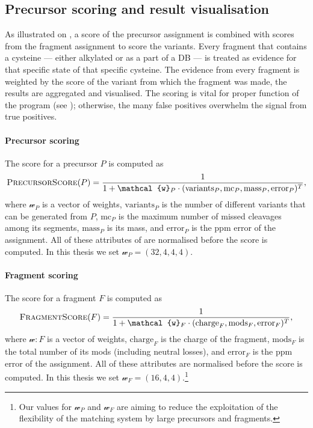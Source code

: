 \subsection{Precursor scoring and result visualisation}\label{sec:scoring}

As illustrated on , a score of the precursor assignment is combined with scores from the fragment assignment to score the variants. Every fragment that contains a cysteine --- either alkylated or as a part of a DB --- is treated as evidence for that specific state of that specific cysteine. The evidence from every fragment is weighted by the score of the variant from which the fragment was made, the results are aggregated and visualised. The scoring is vital for proper function of the program (see ); otherwise, the many false positives overwhelm the signal from true positives.

\paragraph{Precursor scoring} The score for a precursor \(P\) is computed as \[\textsc{PrecursorScore}(P) = \frac{1}{1 + \mathcal{w}_P \cdot (\mathrm{variants}_P, \mathrm{mc}_P, \mathrm{mass}_P, \mathrm{error}_P)^T},\] where \(\mathcal{w}_P\) is a vector of weights, \(\mathrm{variants}_P\) is the number of different variants that can be generated from \(P\), \(\mathrm{mc}_P\) is the maximum number of missed cleavages among its segments, \(\mathrm{mass}_P\) is its mass, and \(\mathrm{error}_P\) is the ppm error of the assignment. All of these attributes of are normalised before the score is computed. In this thesis we set \(\mathcal{w}_P = (32, 4, 4, 4)\).

\paragraph{Fragment scoring} The score for a fragment \(F\) is computed as \[\textsc{FragmentScore}(F) = \frac{1}{1 + \mathcal{w}_F \cdot (\mathrm{charge}_{F}, \mathrm{mods}_F, \mathrm{error}_F)^T},\] where \(\mathcal{w}:F\) is a vector of weights, \(\mathrm{charge}_F\) is the charge of the fragment, \(\mathrm{mods}_F\) is the total number of its mods (including neutral losses), and \(\mathrm{error}_F\) is the ppm error of the assignment. All of these attributes are normalised before the score is computed. In this thesis we set \(\mathcal{w}_F = (16, 4, 4)\).\footnote{Our values for \(\mathcal{w}_P\) and \(\mathcal{w}_F\) are aiming to reduce the exploitation of the flexibility of the matching system by large precursors and fragments.}

